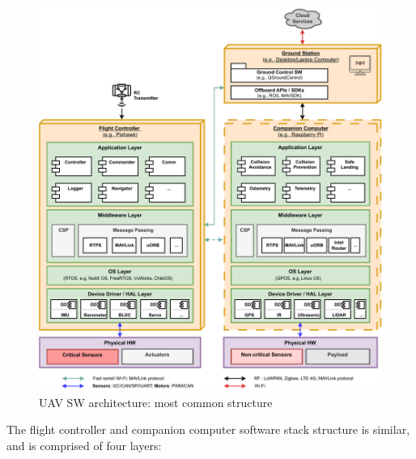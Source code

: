 \begin{figure}[!hbt]
  \centering
  \includegraphics[width=1.0\textwidth]{./img/pdf/uav-sw-arch.pdf} 
%   
  \caption{UAV SW architecture: most common structure}%
  \label{fig:uav-sw-arch}
\end{figure}

The flight controller and companion computer software stack structure is
similar, and is comprised of four layers:

